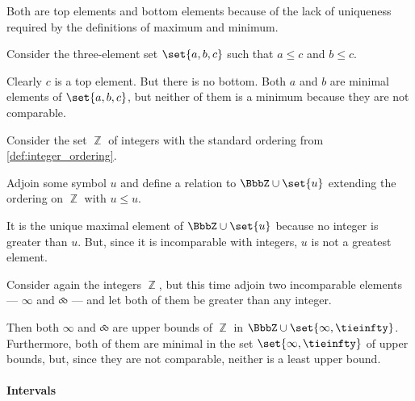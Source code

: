 \begin{example}
\begin{thmenum}
    Both are top elements and bottom elements because of the lack of uniqueness required by the definitions of maximum and minimum.

     Consider the three-element set \( \set{ a, b, c } \) such that \( a \leq c \) and \( b \leq c \).

    Clearly \( c \) is a top element. But there is no bottom. Both \( a \) and \( b \) are minimal elements of \( \set{ a, b, c } \), but neither of them is a minimum because they are not comparable.

     Consider the set \( \BbbZ \) of integers with the standard ordering from \cref{def:integer_ordering}.

    Adjoin some symbol \( u \) and define a relation to \( \BbbZ \cup \set{ u } \) extending the ordering on \( \BbbZ \) with \( u \leq u \).

    It is the unique maximal element of \( \BbbZ \cup \set{ u } \) because no integer is greater than \( u \). But, since it is incomparable with integers, \( u \) is not a greatest element.

     Consider again the integers \( \BbbZ \), but this time adjoin two incomparable elements --- \( \infty \) and \( \tieinfty \) --- and let both of them be greater than any integer.

    Then both \( \infty \) and \( \tieinfty \) are upper bounds of \( \BbbZ \) in \( \BbbZ \cup \set{ \infty, \tieinfty } \). Furthermore, both of them are minimal in the set \( \set{ \infty, \tieinfty } \) of upper bounds, but, since they are not comparable, neither is a least upper bound.
  \end{thmenum}
\end{example}

\paragraph{Intervals}

